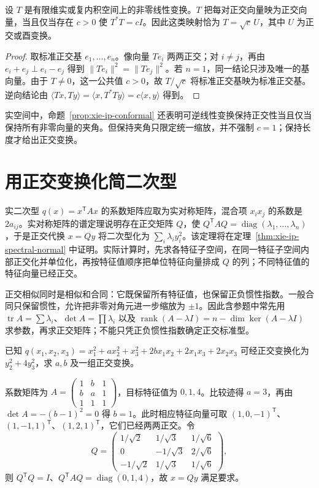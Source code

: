 \begin{proposition}
\label{prop:xie-ip-conformal}
设 $T$ 是有限维实或复内积空间上的非零线性变换。$T$ 把每对正交向量映为正交向量，当且仅当存在 $c>0$ 使 $T^*T=cI$。因此这类映射恰为 $T=\sqrt c\,U$，其中 $U$ 为正交或酉变换。
\end{proposition}
\begin{proof}
取标准正交基 $e_1,\ldots,e_n$。像向量 $Te_i$ 两两正交；对 $i\ne j$，再由 $e_i+e_j\perp e_i-e_j$ 得到 $\|Te_i\|^2=\|Te_j\|^2$。若 $n=1$，同一结论只涉及唯一的基向量。由于 $T\ne0$，这一公共值 $c>0$，故 $T/\sqrt c$ 将标准正交基映为标准正交基。逆向结论由 $\langle Tx,Ty\rangle=\langle x,T^*Ty\rangle=c\langle x,y\rangle$ 得到。
\end{proof}

实空间中，命题~\ref{prop:xie-ip-conformal} 还表明可逆线性变换保持正交性当且仅当保持所有非零向量的夹角。但保持夹角只限定统一缩放，并不强制 $c=1$；保持长度才给出正交变换。

\section{用正交变换化简二次型}
\label{sec:xie-ip-quadratic}

实二次型 $q(x)=x^{\mathsf T}Ax$ 的系数矩阵应取为实对称矩阵，混合项 $x_ix_j$ 的系数是 $2a_{ij}$。实对称矩阵的谱定理说明存在正交矩阵 $Q$，使 $Q^{\mathsf T}AQ=\operatorname{diag}(\lambda_1,\ldots,\lambda_n)$，于是正交代换 $x=Qy$ 将二次型化为 $\sum_i\lambda_iy_i^2$。该定理将在定理~\ref{thm:xie-ip-spectral-normal} 中证明。实际计算时，先求各特征子空间，在同一特征子空间内部正交化并单位化，再按特征值顺序把单位特征向量排成 $Q$ 的列；不同特征值的特征向量已经正交。

正交相似同时是相似和合同：它既保留所有特征值，也保留正负惯性指数。一般合同只保留惯性，允许把非零对角元进一步缩放为 $\pm1$。因此含参题中常先用 $\operatorname{tr}A=\sum\lambda_i$、$\det A=\prod\lambda_i$ 以及 $\operatorname{rank}(A-\lambda I)=n-\dim\ker(A-\lambda I)$ 求参数，再求正交矩阵；不能只凭正负惯性指数确定正交标准型。

\begin{example}
已知 $q(x_1,x_2,x_3)=x_1^2+ax_2^2+x_3^2+2bx_1x_2+2x_1x_3+2x_2x_3$ 可经正交变换化为 $y_2^2+4y_3^2$，求 $a,b$ 及一组正交变换。
\end{example}
\begin{solve}
系数矩阵为 $A=\begin{pmatrix}1&b&1\\b&a&1\\1&1&1\end{pmatrix}$，目标特征值为 $0,1,4$。比较迹得 $a=3$，再由 $\det A=-(b-1)^2=0$ 得 $b=1$。此时相应特征向量可取 $(1,0,-1)^{\mathsf T}$、$(1,-1,1)^{\mathsf T}$、$(1,2,1)^{\mathsf T}$，它们已经两两正交。令
\[
Q=\begin{pmatrix}
1/\sqrt2&1/\sqrt3&1/\sqrt6\\
0&-1/\sqrt3&2/\sqrt6\\
-1/\sqrt2&1/\sqrt3&1/\sqrt6
\end{pmatrix},
\]
则 $Q^{\mathsf T}Q=I$、$Q^{\mathsf T}AQ=\operatorname{diag}(0,1,4)$，故 $x=Qy$ 满足要求。
\end{solve}

